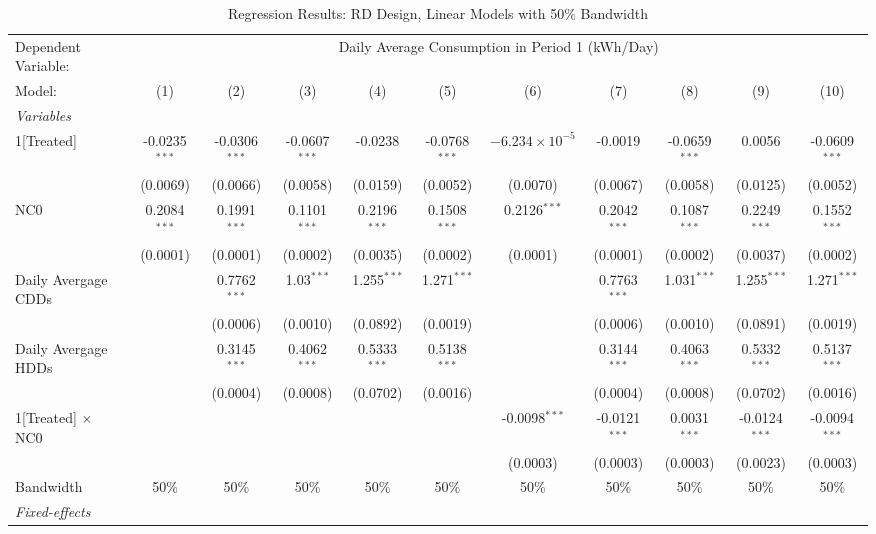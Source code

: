 \begin{table}[htbp]
\centering
\caption{\label{Table:Regression-Results_RD_Linear_BW-50} Regression Results: RD Design, Linear Models with 50\% Bandwidth}
\begin{tabular}{lcccccccccc}
\tabularnewline\toprule\toprule
Dependent Variable:&\multicolumn{10}{c}{Daily Average Consumption in Period 1 (kWh/Day)}\\
Model:&(1) & (2) & (3) & (4) & (5) & (6) & (7) & (8) & (9) & (10)\\
\midrule
\emph{Variables}&   &   &   &   &   &   &   &   &   &  \\
1[Treated]&-0.0235$^{***}$ & -0.0306$^{***}$ & -0.0607$^{***}$ & -0.0238 & -0.0768$^{***}$ & $-6.234\times 10^{-5}$ & -0.0019 & -0.0659$^{***}$ & 0.0056 & -0.0609$^{***}$\\
  &(0.0069) & (0.0066) & (0.0058) & (0.0159) & (0.0052) & (0.0070) & (0.0067) & (0.0058) & (0.0125) & (0.0052)\\
NC0&0.2084$^{***}$ & 0.1991$^{***}$ & 0.1101$^{***}$ & 0.2196$^{***}$ & 0.1508$^{***}$ & 0.2126$^{***}$ & 0.2042$^{***}$ & 0.1087$^{***}$ & 0.2249$^{***}$ & 0.1552$^{***}$\\
  &(0.0001) & (0.0001) & (0.0002) & (0.0035) & (0.0002) & (0.0001) & (0.0001) & (0.0002) & (0.0037) & (0.0002)\\
Daily Avergage CDDs&   & 0.7762$^{***}$ & 1.03$^{***}$ & 1.255$^{***}$ & 1.271$^{***}$ &    & 0.7763$^{***}$ & 1.031$^{***}$ & 1.255$^{***}$ & 1.271$^{***}$\\
  &   & (0.0006) & (0.0010) & (0.0892) & (0.0019) &    & (0.0006) & (0.0010) & (0.0891) & (0.0019)\\
Daily Avergage HDDs&   & 0.3145$^{***}$ & 0.4062$^{***}$ & 0.5333$^{***}$ & 0.5138$^{***}$ &    & 0.3144$^{***}$ & 0.4063$^{***}$ & 0.5332$^{***}$ & 0.5137$^{***}$\\
  &   & (0.0004) & (0.0008) & (0.0702) & (0.0016) &    & (0.0004) & (0.0008) & (0.0702) & (0.0016)\\
1[Treated] $\times $ NC0&   &    &    &    &    & -0.0098$^{***}$ & -0.0121$^{***}$ & 0.0031$^{***}$ & -0.0124$^{***}$ & -0.0094$^{***}$\\
  &   &    &    &    &    & (0.0003) & (0.0003) & (0.0003) & (0.0023) & (0.0003)\\
\midrule Bandwidth & 50\% & 50\% & 50\% & 50\% & 50\% & 50\% & 50\% & 50\% & 50\% & 50\%\\
\midrule
\emph{Fixed-effects}&   &   &   &   &   &   &   &   &   &  \\

\end{tabular}
\end{table}
